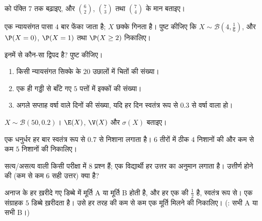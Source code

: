 \begin{exercise}[$\star$]\label{exo:g11:binom:1}
 को पंक्ति $7$ तक बढ़ाइए, और $\binom62$, $\binom{7}{3}$ तथा $\binom74$ के मान
बताइए।
\end{exercise}

\begin{exercise}[$\star$]\label{exo:g11:binom:2}
एक न्यायसंगत पासा $4$ बार फेंका जाता है; $X$ छक्के गिनता है। पुष्ट कीजिए
कि $X \sim \mathcal B\left(4, \frac16\right)$, और $\P(X = 0)$, $\P(X = 1)$ तथा $\P(X \geq 2)$ निकालिए।
\end{exercise}

\begin{exercise}[$\star$]\label{exo:g11:binom:3}
इनमें से कौन-सा द्विपद है? पुष्ट कीजिए।
\begin{enumerate}
  \item किसी न्यायसंगत सिक्के के $20$ उछालों में चितों की संख्या।
  \item एक ही गड्डी से बाँटे गए $5$ पत्तों में इक्कों की संख्या।
  \item अगले सप्ताह वर्षा वाले दिनों की संख्या, यदि हर दिन स्वतंत्र रूप से
         $0.3$ से वर्षा वाला हो।
\end{enumerate}
\end{exercise}

\begin{exercise}[$\star$]\label{exo:g11:binom:4}
$X \sim \mathcal B(50, 0.2)$। $\E(X)$, $\V(X)$ और $\sigma(X)$ बताइए।
\end{exercise}

\begin{exercise}[$\star\star$]\label{exo:g11:binom:5}
एक धनुर्धर हर बार स्वतंत्र रूप से  $0.7$ से निशाना लगाता है। $6$
तीरों में ठीक $4$ निशानों की और कम से कम $5$ निशानों की 
निकालिए।
\end{exercise}

\begin{exercise}[$\star\star$]\label{exo:g11:binom:6}
सत्य/असत्य वाली किसी परीक्षा में $8$ प्रश्न हैं; एक विद्यार्थी हर उत्तर का
अनुमान लगाता है। उत्तीर्ण होने की (कम से कम $6$ सही उत्तर)  क्या
है?
\end{exercise}

\begin{exercise}[$\star\star$]\label{exo:g11:binom:7}
अनाज के हर ख़रीदे गए डिब्बे में मूर्ति A या मूर्ति B होती है, और हर एक की
 $\frac12$ है, स्वतंत्र रूप से। एक संग्राहक $5$ डिब्बे ख़रीदता है।
उसे हर तरह की कम से कम एक मूर्ति मिलने की  निकालिए। (: सभी A या
सभी B।)
\end{exercise}

